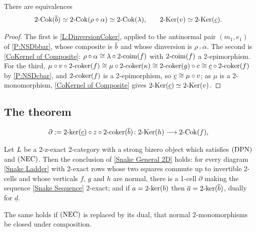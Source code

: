 \begin{lemma}
  \label{L:NSDChain}  
  There are equivalences
	\[
		2\text{-}\mathrm{Cok}(\overline{b})\simeq2\text{-}\mathrm{Cok}(\rho\circ\alpha)\simeq2\text{-}\mathrm{Cok}(\lambda)\text{,}\qquad2\text{-}\mathrm{Ker}(v)\simeq2\text{-}\mathrm{Ker}(\underline{c})\text{.}
	\]
\end{lemma}

\begin{proof}
  The first is \lemx\ref{L:DinversionCoker}, applied to the antinormal pair \((m_1,e_1)\) of \prox\ref{P:NSDbbar}, whose composite is \(\overline{b}\) and whose dinversion is \(\rho\comp\alpha\). The second is \prox\ref{CoKernel of Composite}: \(\rho\circ\alpha\cong\lambda\circ2\text{-}\mathrm{coim}(f)\) with \(2\text{-}\mathrm{coim}(f)\) a 2-epimorphism. For the third, \(\mu\circ v\circ2\text{-}\mathrm{coker}(f)\cong\mu\circ2\text{-}\mathrm{coker}(\kappa)\cong2\text{-}\mathrm{coker}(g)\circ c\cong\underline{c}\circ2\text{-}\mathrm{coker}(f)\) by \prox\ref{P:NSDcbar}, and \(2\text{-}\mathrm{coker}(f)\) is a 2-epimorphism, so \(\underline{c}\cong\mu\circ v\); as \(\mu\) is a 2-monomorphism, \prox\ref{CoKernel of Composite} gives \(2\text{-}\mathrm{Ker}(\underline{c})\simeq2\text{-}\mathrm{Ker}(v)\).
\end{proof}

\subsection{The theorem}\label{SS:NSDTheorem}

\begin{equation}\label{Def Partial NSD}
	\partial\mathrel{:=}2\text{-}\mathrm{ker}(\underline{c})\circ z\circ2\text{-}\mathrm{coker}(\overline{b})\colon2\text{-}\mathrm{Ker}(h)\longrightarrow2\text{-}\mathrm{Cok}(f)\text{,}
\end{equation}

\begin{theorem}
  \label{T:SnakeNonSelfDual}   \leanok
  Let \(\mathit{L}\) be a 2-z-exact 2-category with a strong bizero object which satisfies \(\textup{(DPN)}\) and \(\textup{(NEC)}\). Then the conclusion of \thex\ref{Snake General 2D} holds: for every diagram \eqref{Snake Ladder} with 2-exact rows whose two squares commute up to invertible 2-cells and whose verticals \(f\), \(g\) and \(h\) are normal, there is a 1-cell \(\partial\) making the sequence \eqref{Snake Sequence} 2-exact; and if \(a=2\text{-}\mathrm{ker}(b)\) then \(\overline{a}=2\text{-}\mathrm{ker}(\overline{b})\), dually for \(\underline{d}\).

	The same holds if \(\textup{(NEC)}\) is replaced by its dual, that normal 2-monomorphisms be closed under composition.
\end{theorem}

